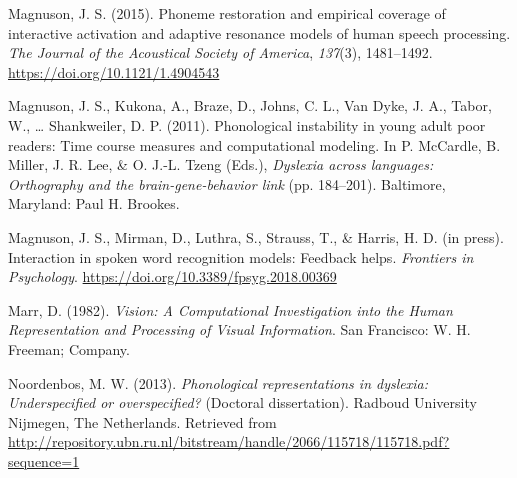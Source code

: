 \documentclass[english,floatsintext,man]{apa6}
\theoremstyle{definition}
\theoremstyle{definition}
\theoremstyle{remark}
\begin{document}
\hypertarget{ref-Magnuson2015}{}
Magnuson, J. S. (2015). Phoneme restoration and empirical coverage of
interactive activation and adaptive resonance models of human speech
processing. \emph{The Journal of the Acoustical Society of America},
\emph{137}(3), 1481--1492. \url{https://doi.org/10.1121/1.4904543}

\hypertarget{ref-Magnuson2011}{}
Magnuson, J. S., Kukona, A., Braze, D., Johns, C. L., Van Dyke, J. A.,
Tabor, W., \ldots{} Shankweiler, D. P. (2011). Phonological instability
in young adult poor readers: Time course measures and computational
modeling. In P. McCardle, B. Miller, J. R. Lee, \& O. J.-L. Tzeng
(Eds.), \emph{Dyslexia across languages: Orthography and the
brain-gene-behavior link} (pp. 184--201). Baltimore, Maryland: Paul H.
Brookes.

\hypertarget{ref-Magnuson2018}{}
Magnuson, J. S., Mirman, D., Luthra, S., Strauss, T., \& Harris, H. D.
(in press). Interaction in spoken word recognition models: Feedback
helps. \emph{Frontiers in Psychology}.
\url{https://doi.org/10.3389/fpsyg.2018.00369}

\hypertarget{ref-Marr1982}{}
Marr, D. (1982). \emph{Vision: A Computational Investigation into the
Human Representation and Processing of Visual Information}. San
Francisco: W. H. Freeman; Company.

\hypertarget{ref-Noordenbos2013a}{}
Noordenbos, M. W. (2013). \emph{Phonological representations in
dyslexia: Underspecified or overspecified?} (Doctoral dissertation).
Radboud University Nijmegen, The Netherlands. Retrieved from
\url{http://repository.ubn.ru.nl/bitstream/handle/2066/115718/115718.pdf?sequence=1}
\end{document}
